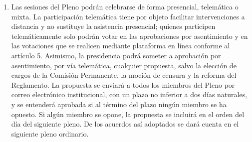 \documentclass[11pt,a4paper]{article}
\begin{document}
\begin{enumerate}
\item Las sesiones del Pleno podrán celebrarse de forma presencial, telemática o mixta. La participación telemática tiene por objeto facilitar intervenciones a distancia y no sustituye la asistencia presencial; quienes participen telemáticamente solo podrán votar en las aprobaciones por asentimiento y en las votaciones que se realicen mediante plataforma en línea conforme al artículo 5. Asimismo, la presidencia podrá someter a aprobación por asentimiento, por vía telemática, cualquier propuesta, salvo la elección de cargos de la Comisión Permanente, la moción de censura y la reforma del Reglamento. La propuesta se enviará a todos los miembros del Pleno por correo electrónico institucional, con un plazo no inferior a dos días naturales, y se entenderá aprobada si al término del plazo ningún miembro se ha opuesto. Si algún miembro se opone, la propuesta se incluirá en el orden del día del siguiente pleno. De los acuerdos así adoptados se dará cuenta en el siguiente pleno ordinario.
\end{enumerate}
\end{document}
